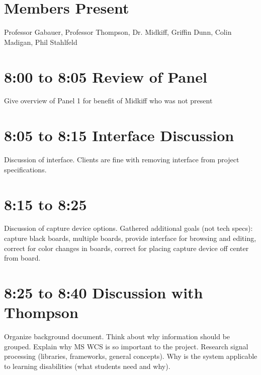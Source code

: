 \documentclass{article}
\begin{document}
    \thispagestyle{fancy}
	
	\section*{Members Present}
		Professor Gabauer, Professor Thompson, Dr. Midkiff, Griffin Dunn, Colin Madigan, Phil Stahlfeld
		
	\section*{8:00 to 8:05 Review of Panel}
		Give overview of Panel 1 for benefit of Midkiff who was not present
		
	\section*{8:05 to 8:15 Interface Discussion}
		Discussion of interface. Clients are fine with removing interface from project specifications.
		
	\section*{8:15 to 8:25}
		Discussion of capture device options. Gathered additional goals (not tech specs): capture black boards, multiple boards, provide interface for browsing and editing, correct for color changes in boards, correct for placing capture device off center from board.
		
	\section*{8:25 to 8:40 Discussion with Thompson}
		Organize background document. Think about why information should be grouped. Explain why MS WCS is so important to the project. Research signal processing (libraries, frameworks, general concepts). Why is the system applicable to learning disabilities (what students need and why). 
		
	
		
\end{document}
